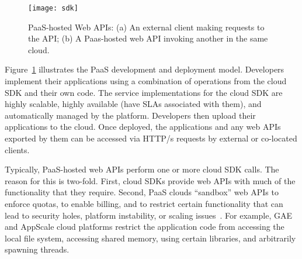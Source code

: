 
\begin{figure}
\centering
\texttt{[image: sdk]}
\caption{PaaS-hosted Web APIs: (a) An external client making requests
to the API;
(b) A Paas-hosted web API invoking another in the same cloud.
\label{fig:cloud_app_model}
}
\vspace{-0.1in}
\end{figure}

Figure~\ref{fig:cloud_app_model} illustrates the PaaS development and deployment model.
Developers implement their applications using a combination of operations
from the cloud SDK and their own code.  The service implementations for the 
cloud SDK are highly scalable, highly available (have SLAs associated with them),
and automatically managed by the platform. Developers then
upload their applications to the cloud.
Once deployed, the applications and any web APIs exported by them can be accessed 
via HTTP/s requests by external or co-located clients.

Typically, PaaS-hosted web APIs perform one or more
cloud SDK calls.  The reason for this is two-fold.  First, 
cloud SDKs provide web APIs with much of the functionality that they require.
Second, PaaS clouds ``sandbox'' web APIs to enforce quotas, to enable billing,
and to restrict certain functionality
that can lead to security holes, platform instability, or scaling issues~\cite{gae-sandbox}.
For example, GAE and AppScale cloud platforms restrict the application code
from accessing the local file system, accessing shared memory, using certain libraries,
and arbitrarily spawning threads.

